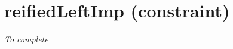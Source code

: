 \section{reifiedLeftImp (constraint)}\label{reifiedleftimp:reifiedleftimpconstraint}\hypertarget{reifiedleftimp:reifiedleftimpconstraint}{}
\emph{To complete}
